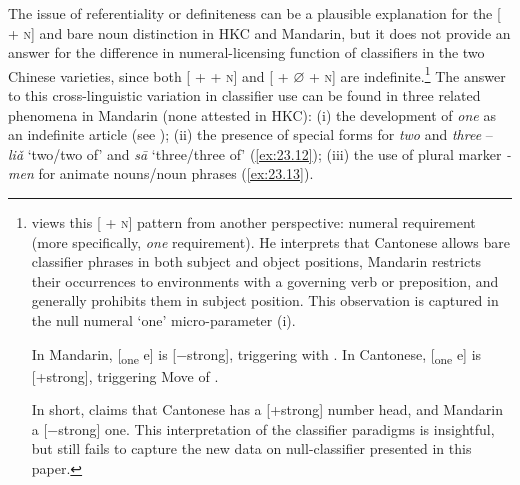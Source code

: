 \documentclass[output=paper]{langsci/langscibook}
\begin{document}
The issue of referentiality or definiteness can be a plausible explanation for
the [\Clf{} + \textsc{n}] and bare noun distinction in \gls{HKC} and Mandarin, but it
does not provide an answer for the difference in numeral-licensing function of
classifiers in the two Chinese varieties, since both [\Num{} + \Clf{} + \textsc{n}] and
[\Num{} + ${\varnothing}$ + \textsc{n}] are indefinite.\footnote{\citet{Huang2015} views
    this [\Clf{} + \textsc{n}] pattern from another perspective: numeral requirement
    (more specifically, \emph{one} requirement). He interprets that Cantonese
    allows bare classifier phrases in both subject and object positions,
    Mandarin restricts their occurrences to environments with a governing verb
    or preposition, and generally prohibits them in subject position. This
    observation is captured in the null numeral ‘one’ micro-parameter (i).

\begin{exe}
    \begin{xlist}
	\ex In Mandarin, [\textsubscript{one} e] is [−strong], triggering  with \Clf{}.
	\ex In Cantonese, [\textsubscript{one} e] is [+strong], triggering Move of \Clf{}.
    \end{xlist}
\end{exe}

In short, \citeauthor{Huang2015} claims that Cantonese has a [+strong] number
head, and Mandarin a [−strong] one. This interpretation of the classifier
paradigms is insightful, but still fails to capture the new data on
null-classifier  presented in this paper.} The answer to this
cross-linguistic variation in classifier use can be found in three related
phenomena in Mandarin (none attested in \gls{HKC}): (i) the development of
\emph{one} as an indefinite article (see ); (ii) the presence
of special forms for \emph{two} and \emph{three} -- \emph{liǎ} ‘two/two of’
and \emph{sā} ‘three/three of’ (\ref{ex:23.12}); (iii) the use of plural
marker \emph{-men} for animate nouns/noun phrases (\ref{ex:23.13}).
\end{document}
